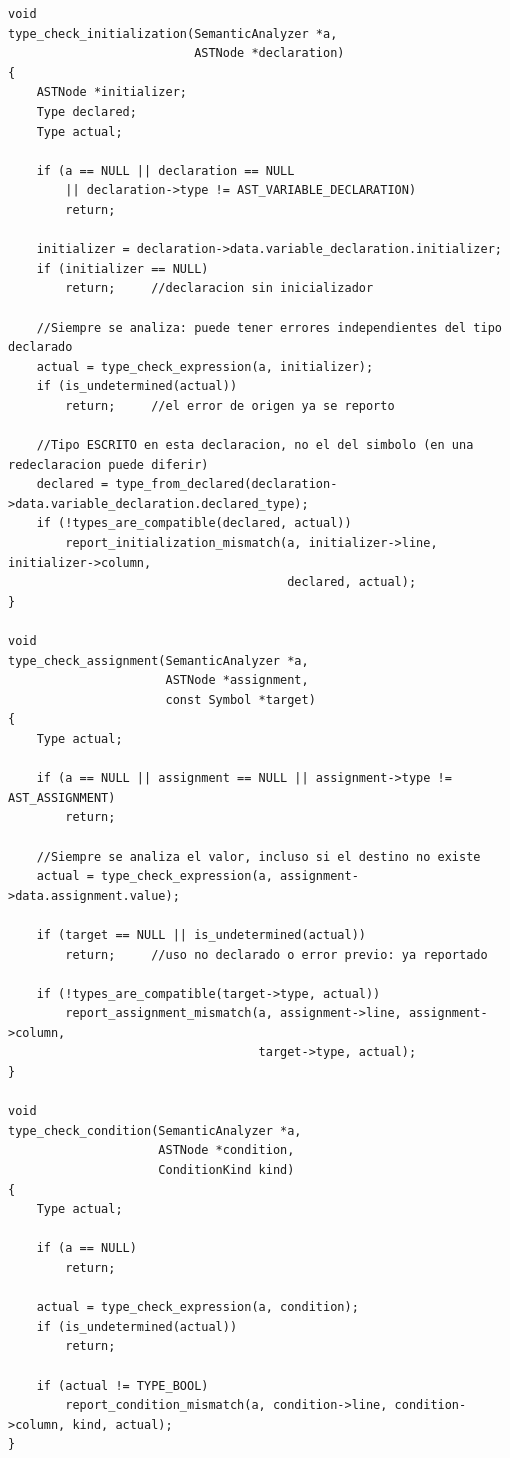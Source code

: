 \documentclass[12pt,letterpaper]{article}
\begin{document}
\begin{lstlisting}[style=modernc, caption={\texttt{type\_checker.c}: inicializaciones, asignaciones y condiciones.}]
void
type_check_initialization(SemanticAnalyzer *a,
                          ASTNode *declaration)
{
    ASTNode *initializer;
    Type declared;
    Type actual;

    if (a == NULL || declaration == NULL
        || declaration->type != AST_VARIABLE_DECLARATION)
        return;

    initializer = declaration->data.variable_declaration.initializer;
    if (initializer == NULL)
        return;     //declaracion sin inicializador

    //Siempre se analiza: puede tener errores independientes del tipo declarado
    actual = type_check_expression(a, initializer);
    if (is_undetermined(actual))
        return;     //el error de origen ya se reporto

    //Tipo ESCRITO en esta declaracion, no el del simbolo (en una redeclaracion puede diferir)
    declared = type_from_declared(declaration->data.variable_declaration.declared_type);
    if (!types_are_compatible(declared, actual))
        report_initialization_mismatch(a, initializer->line, initializer->column,
                                       declared, actual);
}

void
type_check_assignment(SemanticAnalyzer *a,
                      ASTNode *assignment,
                      const Symbol *target)
{
    Type actual;

    if (a == NULL || assignment == NULL || assignment->type != AST_ASSIGNMENT)
        return;

    //Siempre se analiza el valor, incluso si el destino no existe
    actual = type_check_expression(a, assignment->data.assignment.value);

    if (target == NULL || is_undetermined(actual))
        return;     //uso no declarado o error previo: ya reportado

    if (!types_are_compatible(target->type, actual))
        report_assignment_mismatch(a, assignment->line, assignment->column,
                                   target->type, actual);
}

void
type_check_condition(SemanticAnalyzer *a,
                     ASTNode *condition,
                     ConditionKind kind)
{
    Type actual;

    if (a == NULL)
        return;

    actual = type_check_expression(a, condition);
    if (is_undetermined(actual))
        return;

    if (actual != TYPE_BOOL)
        report_condition_mismatch(a, condition->line, condition->column, kind, actual);
}
\end{lstlisting}
\end{document}

